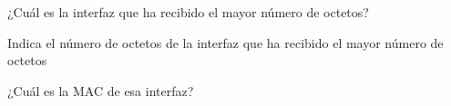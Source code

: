 \item ¿Cuál es la interfaz que ha recibido el mayor número de octetos?
\item Indica el número de octetos  de la interfaz que ha recibido el mayor número de octetos
\item ¿Cuál es la MAC de esa interfaz?

